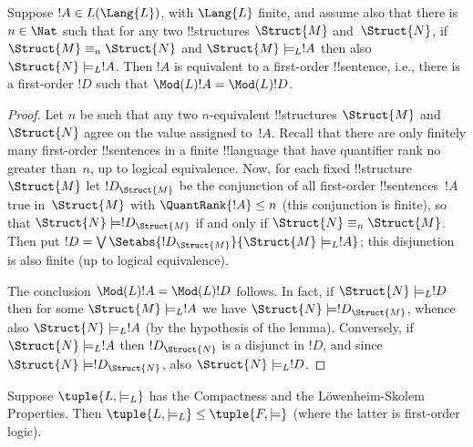 \documentclass[../../include/open-logic-section]{subfiles}
\begin{document}


\begin{lem}
Suppose $!A \in L(\Lang{L})$, with $\Lang{L}$ finite, and assume
also that there is $n \in \Nat$ such that for any two
!!{structure}s $\Struct{M}$ and~$\Struct{N}$, if $\Struct{M} \equiv_n
\Struct{N}$ and $\Struct{M} \models_L !A$ then also $\Struct{N}
\models_L !A$. Then $!A$ is equivalent to a first-order
!!{sentence}, i.e., there is a first-order $!D$ such that
$\Mod(L){!A} = \Mod(L){!D}$.
\end{lem}

\begin{proof} 
Let $n$ be such that any two $n$-equivalent !!{structure}s
$\Struct{M}$ and $\Struct{N}$ agree on the value assigned to~$!A$.
Recall that there are only finitely many first-order !!{sentence}s in
a finite !!{language} that have quantifier rank no greater than~$n$,
up to logical equivalence. Now, for each fixed !!{structure}
$\Struct{M}$ let $!D_{\Struct{M}}$ be the conjunction of all
first-order !!{sentence}s~$!A$ true in~$\Struct{M}$ with
$\QuantRank{!A} \le n$ (this conjunction is finite), so that
$\Struct{N} \models !D_{\Struct{M}}$ if and only if $\Struct{N}
\equiv_n \Struct{M}$. Then put $!D = \textstyle\bigvee
\Setabs{!D_{\Struct{M}}}{\Struct{M} \models_L !A}$; this disjunction
is also finite (up to logical equivalence).

The conclusion $\Mod(L){!A} = \Mod(L){!D}$ follows. In fact, if
$\Struct{N} \models_L !D$ then for some $\Struct{M} \models_L
!A$ we have $\Struct{N} \models !D_{\Struct{M}}$, whence also
$\Struct{N} \models_L !A$ (by the hypothesis of the
lemma). Conversely, if $\Struct{N} \models_L !A$ then
$!D_\Struct{N}$ is a disjunct in $!D$, and since $\Struct{N}
\models !D_\Struct{N}$, also $\Struct{N} \models_L !D$.
\end{proof}

\begin{thm}
Suppose $\tuple{L, \models_L}$ has the Compactness and the
L\"owenheim-Skolem Properties. Then $\tuple{L, \models_L} \le
\tuple{F, \models}$ (where the latter is first-order logic).
\end{thm}
\end{document}
